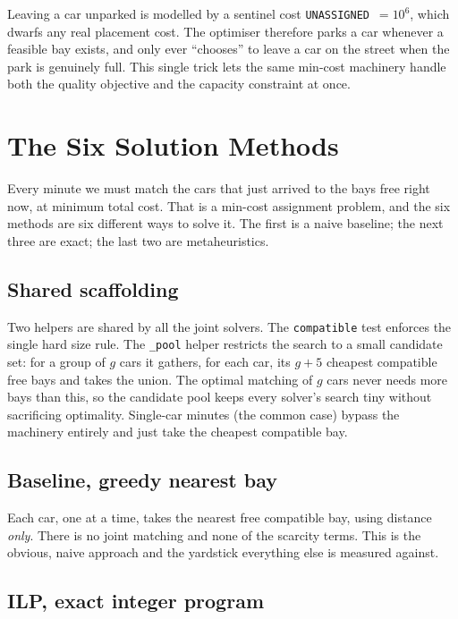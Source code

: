 \documentclass[11pt,a4paper]{article}
\newcommand{\code}[1]{\texttt{\small #1}}
\begin{document}
Leaving a car unparked is modelled by a sentinel cost \code{UNASSIGNED}~$=10^6$, which
dwarfs any real placement cost. The optimiser therefore parks a car whenever a feasible
bay exists, and only ever ``chooses'' to leave a car on the street when the park is
genuinely full. This single trick lets the same min-cost machinery handle both the
quality objective and the capacity constraint at once.

\section{The Six Solution Methods}
\label{sec:methods}

Every minute we must match the cars that just arrived to the bays free right now, at
minimum total cost. That is a min-cost assignment problem, and the six methods are six
different ways to solve it. The first is a naive baseline; the next three are exact; the
last two are metaheuristics.

\subsection{Shared scaffolding}

Two helpers are shared by all the joint solvers. The \code{compatible} test enforces the
single hard size rule. The \code{\_pool} helper restricts the search to a small candidate
set: for a group of $g$ cars it gathers, for each car, its $g+5$ cheapest compatible free
bays and takes the union. The optimal matching of $g$ cars never needs more bays than
this, so the candidate pool keeps every solver's search tiny without sacrificing
optimality. Single-car minutes (the common case) bypass the machinery entirely and just
take the cheapest compatible bay.

\subsection{Baseline, greedy nearest bay}

Each car, one at a time, takes the nearest free compatible bay, using distance
\emph{only}. There is no joint matching and none of the scarcity terms. This is the
obvious, naive approach and the yardstick everything else is measured against.

\subsection{ILP, exact integer program}
\end{document}
